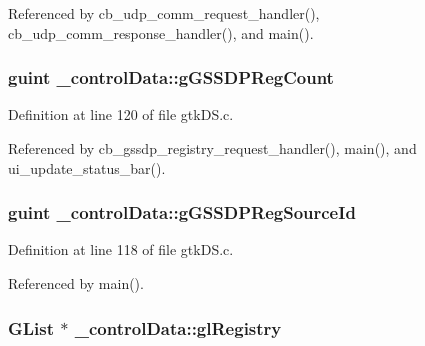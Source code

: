 Referenced by cb\+\_\+udp\+\_\+comm\+\_\+request\+\_\+handler(), cb\+\_\+udp\+\_\+comm\+\_\+response\+\_\+handler(), and main().

\hypertarget{struct__control_data_a841eb51dde0376a7540a23e65933e822}{}
\subsubsection[{g\+G\+S\+S\+D\+P\+Reg\+Count}]{\setlength{\rightskip}{0pt plus 5cm}guint \+\_\+control\+Data\+::g\+G\+S\+S\+D\+P\+Reg\+Count}\label{struct__control_data_a841eb51dde0376a7540a23e65933e822}


Definition at line 120 of file gtk\+D\+S.\+c.



Referenced by cb\+\_\+gssdp\+\_\+registry\+\_\+request\+\_\+handler(), main(), and ui\+\_\+update\+\_\+status\+\_\+bar().

\hypertarget{struct__control_data_a4132cf34364874408e8b15be539e654d}{}
\subsubsection[{g\+G\+S\+S\+D\+P\+Reg\+Source\+Id}]{\setlength{\rightskip}{0pt plus 5cm}guint \+\_\+control\+Data\+::g\+G\+S\+S\+D\+P\+Reg\+Source\+Id}\label{struct__control_data_a4132cf34364874408e8b15be539e654d}


Definition at line 118 of file gtk\+D\+S.\+c.



Referenced by main().

\hypertarget{struct__control_data_a34b1729bc0b37c9dce0327ea4cd8a812}{}
\subsubsection[{gl\+Registry}]{\setlength{\rightskip}{0pt plus 5cm}G\+List $\ast$ \+\_\+control\+Data\+::gl\+Registry}\label{struct__control_data_a34b1729bc0b37c9dce0327ea4cd8a812}


